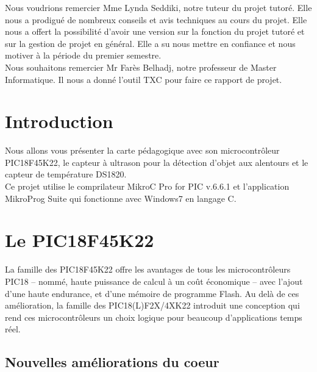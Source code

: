 \documentclass[a4paper, 12pt]{book}
\newcounter{program}[subsection]
\begin{document}
Nous voudrions remercier Mme Lynda Seddiki, notre tuteur du projet tutoré. Elle nous a prodigué de nombreux conseils et avis techniques au cours du projet. Elle nous a offert la possibilité d’avoir une version sur la fonction du projet tutoré et sur la gestion de projet en général. Elle a su nous mettre en confiance et nous motiver à la période du premier semestre.\\

Nous souhaitons remercier Mr Farès Belhadj, notre professeur de Master Informatique. Il nous a donné l’outil TXC pour faire ce rapport de projet.


\chapter*{Introduction}
Nous allons vous présenter la carte pédagogique avec son microcontrôleur PIC18F45K22, le capteur à ultrason pour la détection d'objet aux alentours et le capteur de température DS1820.\\

Ce projet utilise le comprilateur MikroC Pro for PIC v.6.6.1 et l'application MikroProg Suite qui fonctionne avec Windows7 en langage C. \\

\chapter{Le PIC18F45K22}
La famille des PIC18F45K22 offre les avantages de tous les microcontrôleurs  PIC18 – nommé, haute puissance de calcul à un coût économique – avec l’ajout d’une haute endurance, et d’une mémoire de programme Flash. Au delà de ces amélioration, la famille des PIC18(L)F2X/4XK22 introduit une conception qui rend ces microcontrôleurs un choix logique pour beaucoup d’applications temps réel.\\

\section{Nouvelles améliorations du coeur}
\end{document}
